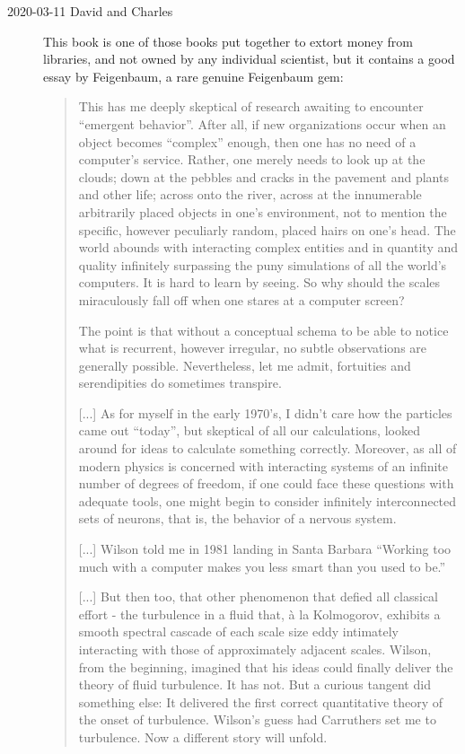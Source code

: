 \begin{description}
  \item[2020-03-11 David and Charles]
This book is one of those books put together to extort 
money from libraries, and not owned by any individual scientist, but it 
contains a good essay by Feigenbaum, a rare genuine Feigenbaum gem: 

\begin{quote}
This has me deeply skeptical of research awaiting to encounter ``emergent
behavior''. After all, if new organizations occur when an object becomes
``complex'' enough, then one has no need of a computer's service. Rather,
one merely needs to look up at the clouds; down at the pebbles and cracks
in the pavement and plants and other life; across onto the river, across
at the innumerable arbitrarily placed objects in one's environment, not
to mention the specific, however peculiarly random, placed hairs on one's
head. The world abounds with interacting complex entities and in quantity
and quality infinitely surpassing the puny simulations of all the world's
computers. It is hard to learn by seeing. So why should the scales
miraculously fall off when one stares at a computer screen?

The point is that without a conceptual schema to be able to notice what
is recurrent, however irregular, no subtle observations are generally
possible. Nevertheless, let me admit, fortuities and serendipities do
sometimes transpire.

[...]
As for myself in the early 1970's, I didn't care how the particles came
out ``today'', but skeptical of all our calculations, looked around for
ideas to calculate something correctly. Moreover, as all of modern
physics is concerned with interacting systems of an infinite number of
degrees of freedom, if one could face these questions with adequate
tools, one might begin to consider infinitely interconnected sets of
neurons, that is, the behavior of a nervous system.

[...]
Wilson told me in 1981 landing in Santa Barbara ``Working too much with a
computer makes you less smart than you used to be.''

[...]
But then too, that other phenomenon that defied all classical effort -
the turbulence in a fluid that, à la Kolmogorov, exhibits a smooth
spectral cascade of each scale size eddy intimately interacting with
those of approximately adjacent scales. Wilson, from the beginning,
imagined that his ideas could finally deliver the theory of fluid
turbulence. It has not. But a curious tangent did something else: It
delivered the first correct quantitative theory of the onset of
turbulence. Wilson's guess had Carruthers set me to turbulence. Now a
different story will unfold.
\end{quote}


\end{description}
